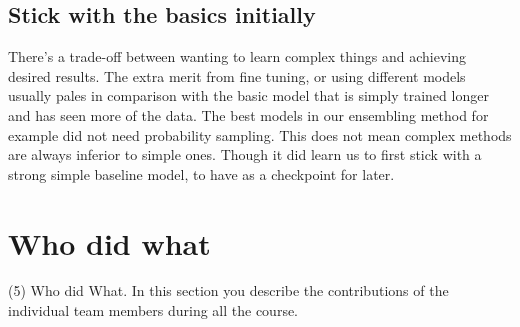 \documentclass[10pt, a4paper]{article}
\begin{document}
\begin{multicols}{2}
		\subsection{Stick with the basics initially}
        There's a trade-off between wanting to learn complex things and achieving desired results. The extra merit from fine tuning, or using different models usually pales in comparison with the basic model that is simply trained longer and has seen more of the data. The best models in our ensembling method for example did not need probability sampling. This does not mean complex methods are always inferior to simple ones. Though it did learn us to first stick with a strong simple baseline model, to have as a checkpoint for later. 
        



	    \section{Who did what}
	    (5) Who did What. In this section you describe the contributions of the individual team members during all the course.


	
	
	\end{multicols}
	
\end{document}
